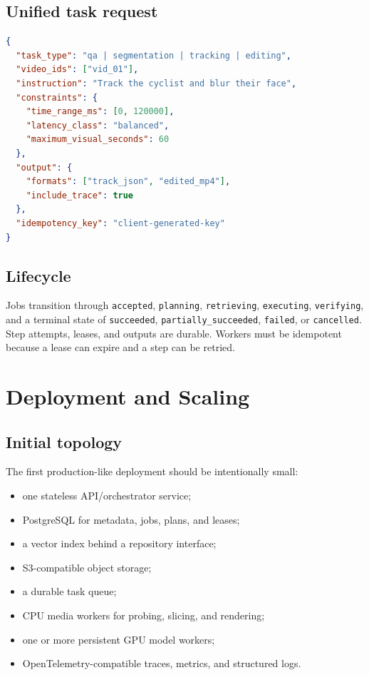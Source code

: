 \documentclass[11pt]{article}
\newcommand{\code}[1]{\texttt{#1}}
\begin{document}
\subsection{Unified task request}

\begin{lstlisting}[language=json]
{
  "task_type": "qa | segmentation | tracking | editing",
  "video_ids": ["vid_01"],
  "instruction": "Track the cyclist and blur their face",
  "constraints": {
    "time_range_ms": [0, 120000],
    "latency_class": "balanced",
    "maximum_visual_seconds": 60
  },
  "output": {
    "formats": ["track_json", "edited_mp4"],
    "include_trace": true
  },
  "idempotency_key": "client-generated-key"
}
\end{lstlisting}

\subsection{Lifecycle}

Jobs transition through \code{accepted}, \code{planning}, \code{retrieving},
\code{executing}, \code{verifying}, and a terminal state of \code{succeeded},
\code{partially\_succeeded}, \code{failed}, or \code{cancelled}. Step attempts,
leases, and outputs are durable. Workers must be idempotent because a lease can
expire and a step can be retried.

\section{Deployment and Scaling}

\subsection{Initial topology}

The first production-like deployment should be intentionally small:

\begin{itemize}
  \item one stateless API/orchestrator service;
  \item PostgreSQL for metadata, jobs, plans, and leases;
  \item a vector index behind a repository interface;
  \item S3-compatible object storage;
  \item a durable task queue;
  \item CPU media workers for probing, slicing, and rendering;
  \item one or more persistent GPU model workers;
  \item OpenTelemetry-compatible traces, metrics, and structured logs.
\end{itemize}
\end{document}
